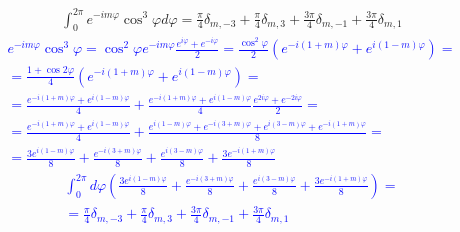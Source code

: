 %
\begin{equation} \begin{aligned} \label{eq:int_exp6}
\int_{0}^{2\pi} e^{-i m \varphi} \cos^3 \varphi d \varphi = 
\frac{\pi}{4} \delta_{m,-3} + \frac{\pi}{4} \delta_{m,3} + 
\frac{3 \pi}{4} \delta_{m,-1} + \frac{3 \pi}{4} \delta_{m,1}
\end{aligned} \end{equation}
%
\textcolor{blue}{ \begin{equation*} \begin{aligned}
e^{-i m \varphi} \cos^3 \varphi = 
\cos^2 \varphi e^{-i m \varphi} \frac{e^{i \varphi} + e^{-i \varphi}}{2} =
\frac{\cos^2 \varphi}{2} 
\left( e^{-i (1+m) \varphi} + e^{i (1-m) \varphi} \right) = \\
= \frac{ 1 + \cos 2 \varphi } { 4 } 
\left( e^{-i (1+m) \varphi} + e^{i (1-m) \varphi} \right) = \\
= \frac{e^{-i(1+m) \varphi} + e^{i(1-m) \varphi}}{4} + 
\frac{e^{-i(1+m) \varphi} + e^{i(1-m) \varphi}}{4}
\frac{e^{2i\varphi} + e^{-2i\varphi}}{2} = \\
= \frac{e^{-i(1+m) \varphi} + e^{i(1-m) \varphi}}{4} +
\frac{ e^{i(1-m) \varphi} + e^{-i(3+m) \varphi} + 
e^{i(3-m) \varphi} + e^{-i(1+m) \varphi} }{8} = \\
= \frac{3 e^{i(1-m) \varphi}}{8} + \frac{e^{-i(3+m) \varphi}}{8} +
\frac{e^{i(3-m) \varphi}}{8} + \frac{ 3 e^{-i(1+m) \varphi} }{8}
\end{aligned} \end{equation*} }
%
\textcolor{blue}{ \begin{equation*} \begin{aligned}
\int_{0}^{2\pi} d \varphi \left( \frac{3 e^{i(1-m) \varphi}}{8} + 
\frac{e^{-i(3+m) \varphi}}{8} + \frac{e^{i(3-m) \varphi}}{8} + 
\frac{ 3 e^{-i(1+m) \varphi} }{8} \right) = \\
= \frac{\pi}{4} \delta_{m,-3} + \frac{\pi}{4} \delta_{m,3} + 
\frac{3 \pi}{4} \delta_{m,-1} + \frac{3 \pi}{4} \delta_{m,1}
\end{aligned} \end{equation*} }

